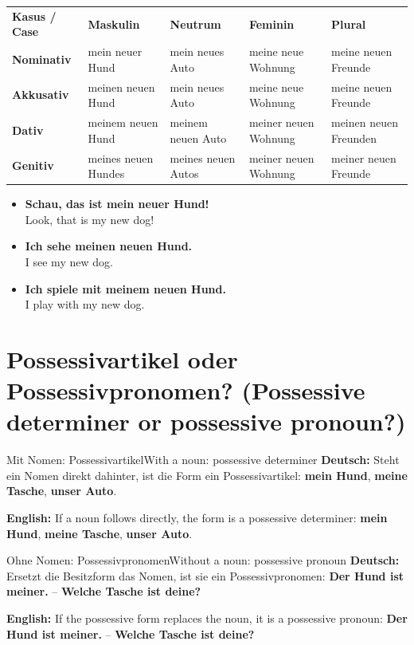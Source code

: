 \documentclass[a4paper,11pt]{article}
\newcommand{\GermanText}[1]{\textbf{Deutsch: }#1\par}
\newcommand{\EnglishText}[1]{{\small\color{SoftGray}\textbf{English: }#1\par}}
\newcommand{\ExampleItem}[2]{\item \textbf{#1}\\{\small\color{SoftGray}#2}}
\begin{document}
\begin{longtable}{>{\bfseries}p{2.5cm}|p{3.0cm}|p{3.0cm}|p{3.0cm}|p{3.2cm}}
\rowcolor{HeaderBlueDark}
\color{white}\textbf{Kasus / Case} &
\color{white}\textbf{Maskulin} &
\color{white}\textbf{Neutrum} &
\color{white}\textbf{Feminin} &
\color{white}\textbf{Plural} \\
Nominativ & mein neuer Hund & mein neues Auto & meine neue Wohnung & meine neuen Freunde \\
Akkusativ & meinen neuen Hund & mein neues Auto & meine neue Wohnung & meine neuen Freunde \\
Dativ & meinem neuen Hund & meinem neuen Auto & meiner neuen Wohnung & meinen neuen Freunden \\
Genitiv & meines neuen Hundes & meines neuen Autos & meiner neuen Wohnung & meiner neuen Freunde \\
\end{longtable}

\begin{exbox}
\begin{itemize}
\ExampleItem{Schau, das ist mein neuer Hund!}{Look, that is my new dog!}
\ExampleItem{Ich sehe meinen neuen Hund.}{I see my new dog.}
\ExampleItem{Ich spiele mit meinem neuen Hund.}{I play with my new dog.}
\end{itemize}
\end{exbox}

\section{Possessivartikel oder Possessivpronomen? \textnormal{(Possessive determiner or possessive pronoun?)}}

\begin{grammarentry}{Mit Nomen: Possessivartikel}{With a noun: possessive determiner}
\GermanText{Steht ein Nomen direkt dahinter, ist die Form ein Possessivartikel: \textbf{mein Hund}, \textbf{meine Tasche}, \textbf{unser Auto}.}
\EnglishText{If a noun follows directly, the form is a possessive determiner: \textbf{mein Hund}, \textbf{meine Tasche}, \textbf{unser Auto}.}
\end{grammarentry}

\begin{grammarentry}{Ohne Nomen: Possessivpronomen}{Without a noun: possessive pronoun}
\GermanText{Ersetzt die Besitzform das Nomen, ist sie ein Possessivpronomen: \textbf{Der Hund ist meiner.} -- \textbf{Welche Tasche ist deine?}}
\EnglishText{If the possessive form replaces the noun, it is a possessive pronoun: \textbf{Der Hund ist meiner.} -- \textbf{Welche Tasche ist deine?}}
\end{grammarentry}
\end{document}
